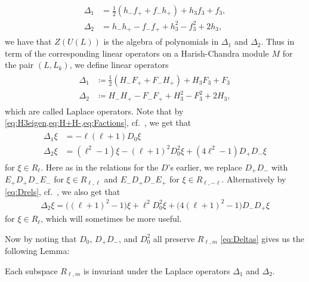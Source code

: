 \begin{align}\label{eq:DeltasaU(L)def}
  \begin{aligned}
  \Delta_1 &= \tfrac{1}{2}(h_-f_++f_-h_+)+h_3f_3+f_3, \\
  \Delta_2 &= h_-h_+ - f_-f_+ + h_3^2 - f_3^2 + 2h_3,
\end{aligned}
\end{align}
we have that $Z(U(L))$ is the algebra of polynomials in $\Delta_1$ and $\Delta_2$. Thus in term of the corresponding linear operators on a Harish-Chandra module $M$ for the pair $(L,L_k)$, we define linear operators
\begin{align}\label{eq:Deltasdef}
  \begin{aligned}
    \Delta_1 &\coloneqq \tfrac{1}{2}(H_-F_++F_-H_+) + H_3F_3 + F_3 \\
    \Delta_2 &\coloneqq H_-H_+ - F_-F_+ + H_3^2 - F_3^2 + 2H_3,
  \end{aligned}
\end{align}
which are called Laplace operators. Note that by \cref{eq:H3eigen,eq:H+H-,eq:Factions}, cf.\ , we get that
\begin{align}\label{eq:Deltas}
  \begin{aligned}
    \Delta_1 \xi &= -\ell(\ell+1)D_0\xi \\
    \Delta_2 \xi &= (\ell^2-1)\xi - (\ell+1)^2D_0^2\xi + (4\ell^2-1)D_+D_-\xi
  \end{aligned}                 
\end{align}
for $\xi\in R_\ell$. Here as in the relations for the $D$'s earlier, we replace $D_+D_-$ with $E_+D_+D_-E_-$ for $\xi \in R_{\ell,\ell}$ and $E_-D_+D_-E_+$ for $\xi\in R_{\ell,-\ell}$. Alternatively by \cref{eq:Drels}, cf.\ , we also get that
\begin{align}\label{eq:altDelta2}
  \Delta_2 \xi = \bigl((\ell+1)^2-1\bigr)\xi  + \ell^2D_0^2\xi + \bigl(4(\ell+1)^2-1\bigr)D_-D_+\xi
\end{align}
for $\xi\in R_\ell$, which will sometimes be more useful.

Now by noting that $D_0$, $D_+D_-$, and $D_0^2$ all preserve $R_{\ell,m}$ \cref{eq:Deltas} gives us the following Lemma:
\begin{lemma}\label{lem:R_lmDeltainvariant}
  Each subspace $R_{\ell,m}$ is invariant under the Laplace operators $\Delta_1$ and $\Delta_2$. 
\end{lemma}

